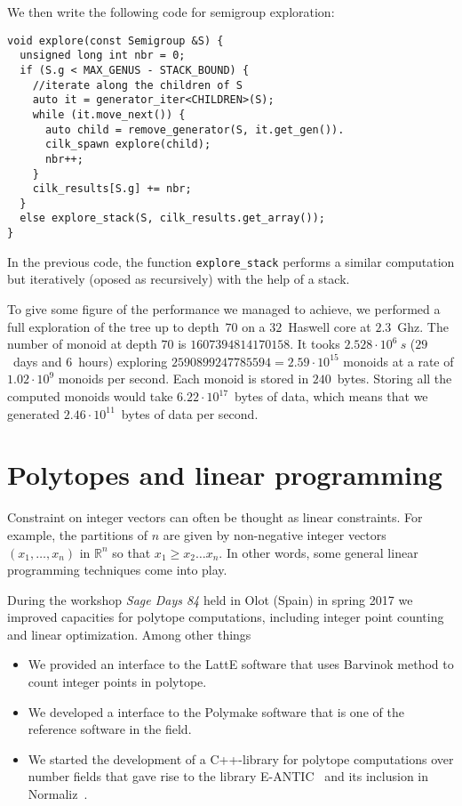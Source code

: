 \documentclass{deliverablereport}
\begin{document}
We then write the following code for semigroup exploration:
\begin{verbatim}
void explore(const Semigroup &S) {
  unsigned long int nbr = 0;
  if (S.g < MAX_GENUS - STACK_BOUND) {
    //iterate along the children of S
    auto it = generator_iter<CHILDREN>(S); 
    while (it.move_next()) {
      auto child = remove_generator(S, it.get_gen()).
      cilk_spawn explore(child);
      nbr++;
    }
    cilk_results[S.g] += nbr;
  }
  else explore_stack(S, cilk_results.get_array());
}
\end{verbatim}
In the previous code, the function \verb+explore_stack+ performs a similar
computation but iteratively (oposed as recursively) with the help of a stack.

To give some figure of the performance we managed to achieve, we performed
a full exploration of the tree up to depth~$70$ on a $32$~Haswell core at
$2.3$~Ghz. The number of monoid at depth $70$ is $1607394814170158$.  It tooks
$2.528\cdot10^{6}~s$ ($29$~days and $6$~hours) exploring
$2590899247785594=2.59\cdot10^{15}$ monoids at a rate of $1.02\cdot10^{9}$
monoids per second. Each monoid is stored in $240$~bytes. Storing all the
computed monoids would take $6.22\cdot10^{17}$~bytes of data, which means that
we generated $2.46\cdot10^{11}$~bytes of data per second.


\section{Polytopes and linear programming}

Constraint on integer vectors can often be thought as linear constraints.
For example, the partitions of $n$ are given by non-negative integer
vectors $(x_1, \ldots, x_n)$ in $\mathbb{R}^n$ so that $x_1 \geq x_2 \ldots x_n$.
In other words, some general linear programming techniques come into
play.

During the \ODK workshop \textit{Sage Days 84} held in Olot (Spain) in spring
2017 we improved \Sage capacities for polytope computations, including
integer point counting and linear optimization. Among other things
\begin{itemize}
\item We provided an interface to the LattE software that uses Barvinok
method to count integer points in polytope.
\item We developed a \Sage interface to the Polymake software that is
one of the reference software in the field.
\item We started the development of a C++-library for polytope computations
over number fields that gave rise to the library E-ANTIC~\cite{eantic-code}
 and its inclusion in Normaliz~\cite{normaliz-code}.
\end{itemize}
        
\end{document}

